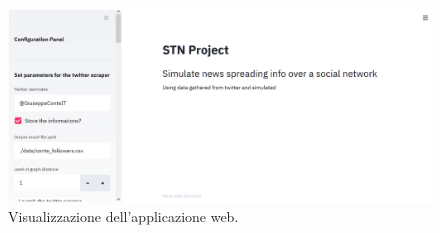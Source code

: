           \begin{figure}[H]
              \includegraphics[width=16cm]{resources/panelApp.png}
              \caption{Visualizzazione dell'applicazione web.}
          \end{figure}
          
